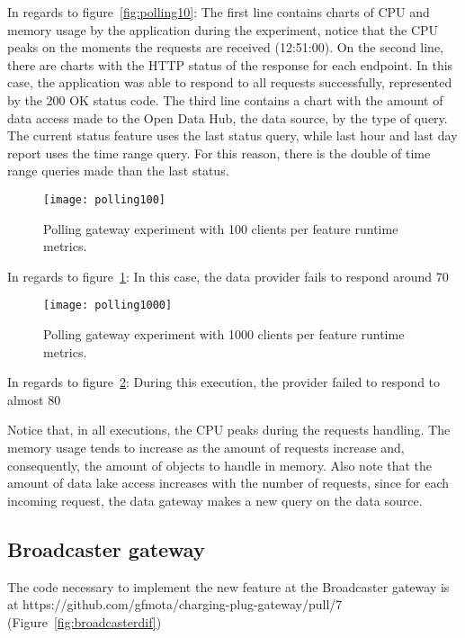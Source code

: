 In regards to figure~\ref{fig:polling10}: The first line contains charts of CPU and memory usage by the application during the experiment, notice that the CPU peaks on the moments the requests are received (12:51:00). On the second line, there are charts with the HTTP status of the response for each endpoint. In this case, the application was able to respond to all requests successfully, represented by the 200 OK status code. The third line contains a chart with the amount of data access made to the Open Data Hub, the data source, by the type of query. The current status feature uses the last status query, while last hour and last day report uses the time range query. For this reason, there is the double of time range queries made than the last status. 

\begin{figure}
    \centering
    \texttt{[image: polling100]}
    \caption{Polling gateway experiment with 100 clients per feature runtime metrics.\label{fig:polling100}}
\end{figure}

In regards to figure~\ref{fig:polling100}: In this case, the data provider fails to respond around 70%

\begin{figure}
    \centering
    \texttt{[image: polling1000]}
    \caption{Polling gateway experiment with 1000 clients per feature runtime metrics.\label{fig:polling1000}}
\end{figure}

In regards to figure~\ref{fig:polling1000}: During this execution, the provider failed to respond to almost 80%

Notice that, in all executions, the CPU peaks during the requests handling. The memory usage tends to increase as the amount of requests increase and, consequently, the amount of objects to handle in memory. Also note that the amount of data lake access increases with the number of requests, since for each incoming request, the data gateway makes a new query on the data source.

\subsection*{Broadcaster gateway}
\label{sec:broadcasterresult}

The code necessary to implement the new feature at the Broadcaster gateway is at https://github.com/gfmota/charging-plug-gateway/pull/7 (Figure~\ref{fig:broadcasterdif})

